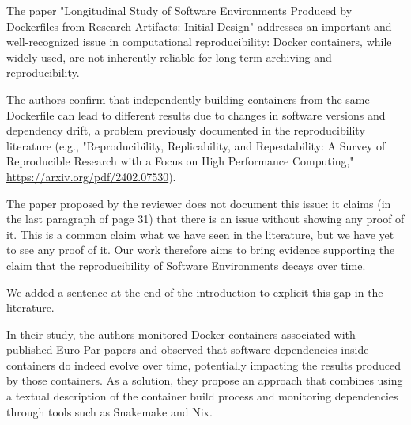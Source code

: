 \documentclass[%
	11pt,
	final,
]{article}
\begin{document}
The paper "Longitudinal Study of Software Environments Produced by Dockerfiles from Research Artifacts: Initial Design" addresses an important and well-recognized issue in computational reproducibility: Docker containers, while widely used, are not inherently reliable for long-term archiving and reproducibility. 

The authors confirm that independently building containers from the same Dockerfile can lead to different results due to changes in software versions and dependency drift, a problem previously documented in the reproducibility literature (e.g., "Reproducibility, Replicability, and Repeatability: A Survey of Reproducible Research with a Focus on High Performance Computing," \url{https://arxiv.org/pdf/2402.07530}).

\begin{review-answer}
The paper proposed by the reviewer does not document this issue: it claims (in the last paragraph of page 31) that there is an issue without showing any proof of it.
This is a common claim what we have seen in the literature, but we have yet to see any proof of it.
Our work therefore aims to bring evidence supporting the claim that the reproducibility of Software Environments decays over time.

We added a sentence at the end of the introduction to explicit this gap in the literature.
\end{review-answer}

In their study, the authors monitored Docker containers associated with published Euro-Par papers and observed that software dependencies inside containers do indeed evolve over time, potentially impacting the results produced by those containers.
As a solution, they propose an approach that combines using a textual description of the container build process and monitoring dependencies through tools such as Snakemake and Nix.
\end{document}
